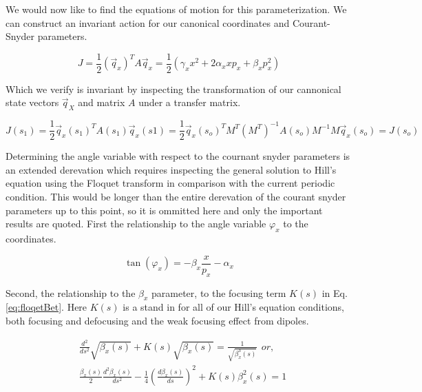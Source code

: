 We would now like to find the equations of motion for this parameterization. We can construct an invariant action for our canonical coordinates and Courant-Snyder parameters.

\begin{equation} \label{eq:csJ}
	J = \frac{1}{2} (\vec{q}_x)^T A \vec{q}_x = \frac{1}{2} (\gamma_x x^2 + 2\alpha_x x p_x + \beta_x p_x^2)
\end{equation}

Which we verify is invariant by inspecting the transformation of our cannonical state vectors $\vec{q}_X$ and matrix $A$ under a transfer matrix.

\begin{equation} \label{eq:Jinvariant}
	J(s_1) = \frac{1}{2} \vec{q}_x(s_1)^T A(s_1) \vec{q}_x(s1) = \frac{1}{2} \vec{q}_x(s_o)^T M^T (M^T)^{-1} A(s_o) M^{-1}  M \vec{q}_x(s_o) = J(s_o)
\end{equation}

Determining the angle variable with respect to the cournant snyder parameters is an extended derevation which requires inspecting the general solution to Hill's equation using the Floquet transform in comparison with the current periodic condition. This would be longer than the entire derevation of the courant snyder parameters up to this point, so it is ommitted here and only the important results are quoted. First the relationship to the angle variable $\varphi_x$ to the coordinates.

\begin{equation} \label{eq:csAngle}
	\tan{(\varphi_x)} = -\beta_x \frac{x}{p_x} - \alpha_x 
\end{equation}

Second, the relationship to the $\beta_x$ parameter, to the focusing term $K(s)$ in Eq. \ref{eq:floqetBet}. Here $K(s)$ is a stand in for all of our Hill's equation conditions, both focusing and defocusing and the weak focusing effect from dipoles. 

\begin{equation} \label{eq:floqetBet}
	\begin{split}
	&\frac{d^2}{ds^2}\sqrt{\beta_x(s)} + K(s)\sqrt{\beta_x(s)} = \frac{1}{\sqrt{\beta_x^3(s)}} \hspace{5pt} or,\\ 
	&\frac{\beta_x(s)}{2}\frac{d^2\beta_x(s)}{ds^2} - \frac{1}{4}\left(\frac{d\beta_x(s)}{ds}\right)^2 + K(s)\beta_x^2(s) = 1
	\end{split}
\end{equation}

